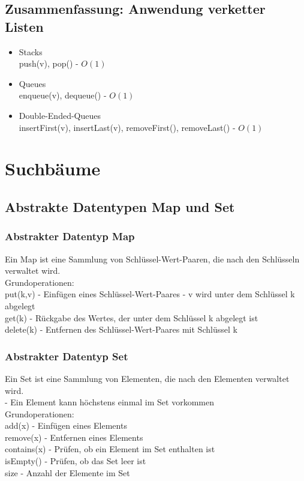 \documentclass{scrreprt}
\begin{document}
\section{Zusammenfassung: Anwendung verketter Listen}
\begin{itemize}
  \item Stacks
  \\ push(v), pop() - $O(1)$
  \item Queues
  \\ enqueue(v), dequeue() - $O(1)$
  \item Double-Ended-Queues
  \\ insertFirst(v), insertLast(v), removeFirst(), removeLast() - $O(1)$
\end{itemize}

\chapter{Suchbäume}
\section{Abstrakte Datentypen Map und Set}
\subsection{Abstrakter Datentyp Map}
Ein Map ist eine Sammlung von Schlüssel-Wert-Paaren, die nach den Schlüsseln verwaltet wird.
\\ Grundoperationen:
\\ put(k,v) - Einfügen eines Schlüssel-Wert-Paares - v wird unter dem Schlüssel k abgelegt
\\ get(k) - Rückgabe des Wertes, der unter dem Schlüssel k abgelegt ist
\\ delete(k) - Entfernen des Schlüssel-Wert-Paares mit Schlüssel k
\subsection{Abstrakter Datentyp Set}
Ein Set ist eine Sammlung von Elementen, die nach den Elementen verwaltet wird.
\\ - Ein Element kann höchstens einmal im Set vorkommen
\\ Grundoperationen:
\\ add(x) - Einfügen eines Elements
\\ remove(x) - Entfernen eines Elements
\\ contains(x) - Prüfen, ob ein Element im Set enthalten ist
\\ isEmpty() - Prüfen, ob das Set leer ist
\\ size - Anzahl der Elemente im Set
\end{document}
